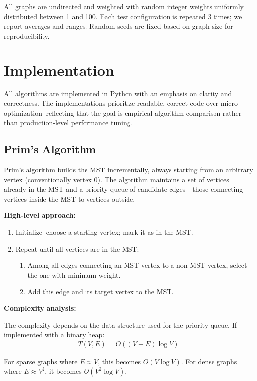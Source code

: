\documentclass{labreport}
\begin{document}
All graphs are undirected and weighted with random integer weights uniformly distributed between 1 and 100. Each test configuration is repeated 3 times; we report averages and ranges. Random seeds are fixed based on graph size for reproducibility.

\section{Implementation}

All algorithms are implemented in Python with an emphasis on clarity and correctness. The implementations prioritize readable, correct code over micro-optimization, reflecting that the goal is empirical algorithm comparison rather than production-level performance tuning.

\subsection{Prim's Algorithm}

Prim's algorithm builds the MST incrementally, always starting from an arbitrary vertex (conventionally vertex 0). The algorithm maintains a set of vertices already in the MST and a priority queue of candidate edges---those connecting vertices inside the MST to vertices outside.

\textbf{High-level approach:}
\begin{enumerate}
    \item Initialize: choose a starting vertex; mark it as in the MST.
    \item Repeat until all vertices are in the MST:
    \begin{enumerate}
        \item Among all edges connecting an MST vertex to a non-MST vertex, select the one with minimum weight.
        \item Add this edge and its target vertex to the MST.
    \end{enumerate}
\end{enumerate}

\textbf{Complexity analysis:}

The complexity depends on the data structure used for the priority queue. If implemented with a binary heap:
\begin{align*}
    T(V, E) = O((V + E) \log V)
\end{align*}

For sparse graphs where $E \approx V$, this becomes $O(V \log V)$. For dense graphs where $E \approx V^2$, it becomes $O(V^2 \log V)$.
\end{document}
